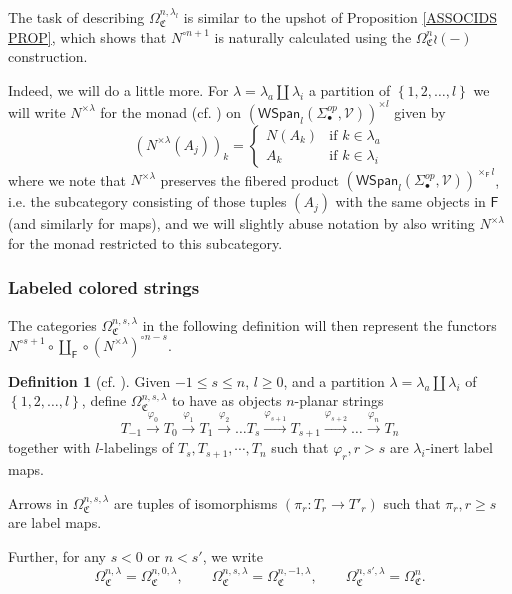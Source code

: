 \documentclass[a4paper,10pt
,draft
]{article}%
\numberwithin{equation}{section}
\numberwithin{figure}{section}
\theoremstyle{definition} %
\newtheorem{definition}[equation]{Definition}%
\newcommand{\set}[1]{\left\{#1\right\}}%
\newcommand{\1}{\ensuremath{\mathbbm 1}}%
\begin{document}
The task of describing 
$\Omega^{n,\lambda_l}_{\mathfrak{C}}$
is similar to the upshot of Proposition \ref{ASSOCIDS PROP}, which shows that
$N^{\circ n+1}$ is naturally calculated using the
$\Omega_{\mathfrak{C}}^{n} \wr (-)$ 
construction.

Indeed, we will do a little more. For $\lambda = \lambda_a \amalg \lambda_i$
a partition of $\set{1,2,\dots,l}$
we will write 
$N^{\times \lambda}$
for the monad (cf. \cite[\S 2.3]{BP_geo}) on 
$\left(\mathsf{WSpan}_l(\Sigma_{\bullet}^{op},\mathcal{V})\right)^{\times l}$
given by
\[
\left(N^{\times \lambda} (A_j)\right)_k = 
\begin{cases}
N(A_k) & \text{if } k\in \lambda_a
\\
A_k & \text{if } k\in \lambda_i
\end{cases}
\]
where we note that $N^{\times \lambda}$
preserves the fibered product
$\left(\mathsf{WSpan}_l(\Sigma_{\bullet}^{op},\mathcal{V})\right)^{\times_{\mathsf{F}} l}$,
i.e. the subcategory consisting of those tuples $(A_j)$ with the same objects in $\mathsf{F}$ (and similarly for maps), and we will slightly abuse notation by also writing 
$N^{\times \lambda}$
for the monad restricted to this subcategory.


\subsubsection{Labeled colored strings}
\label{LCS_SEC}

The categories $\Omega_{\mathfrak C}^{n,s,\lambda}$ in the following definition will then represent
the functors
$N^{\circ s+1} \circ \coprod_{\mathsf{F}} \circ \left(N^{\times \lambda}\right)^{\circ n-s}$.

 

\begin{definition}[{cf. \cite[Defn. 5.10]{BP_geo}}]\label{CLPS DEF}
      Given $-1 \leq s \leq n$, $l \geq 0$, and a partition $\lambda = \lambda_a \amalg \lambda_i$ of $\set{1,2,\dots,l}$,
      define $\Omega_{\mathfrak C}^{n,s,\lambda}$ to have as objects
$n$-planar strings
\begin{equation}
	T_{-1} \xrightarrow{\varphi_0} T_0 \xrightarrow{\varphi_1} T_1 \xrightarrow{\varphi_2} \dots
	T_{s} \xrightarrow{\varphi_{s+1}} T_{s+1} \xrightarrow{\varphi_{s+2}}  \dots
	\xrightarrow{\varphi_n} T_n
\end{equation}
together with $l$-labelings of $T_s, T_{s+1}, \cdots, T_n$
such that
$\varphi_{r}, r>s$ are $\lambda_i$-inert label maps.

Arrows in $\Omega_{\mathfrak C}^{n,s,\lambda}$
are tuples of isomorphisms $\left(\pi_r \colon T_r \to T'_r\right)$
such that $\pi_r,r \geq s$ are label maps.

Further, for any $s<0$ or $n<s'$, we write
\[
      \Omega_{\mathfrak C}^{n,\lambda} = \Omega_{\mathfrak C}^{n,0,\lambda},
      \qquad
\Omega_{\mathfrak{C}}^{n,s,\lambda} = \Omega_{\mathfrak{C}}^{n,-1,\lambda},
\qquad
\Omega_{\mathfrak{C}}^{n,s',\lambda} = \Omega_{\mathfrak{C}}^{n}.
\]
\end{definition}
\end{document}
